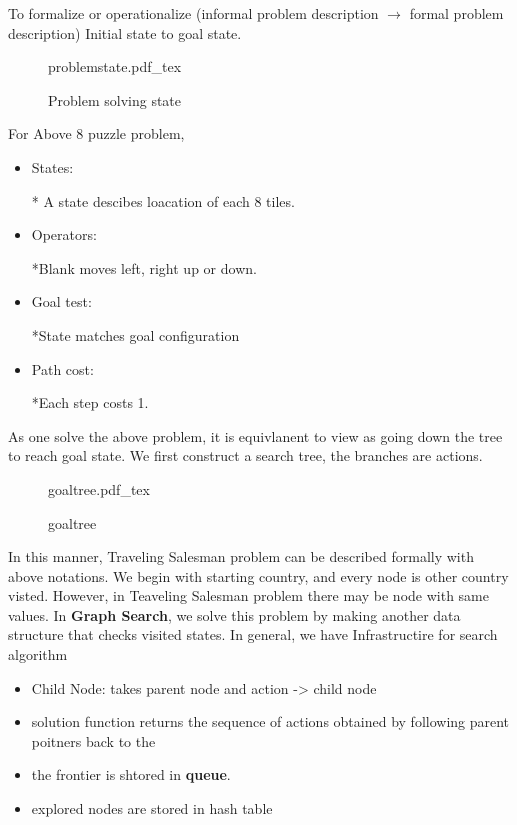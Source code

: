 \documentclass[12pt]{article}
\begin{document}
\maketitle
To formalize or operationalize (informal problem description $\rightarrow$ formal problem description)
Initial state to goal state.
\begin{figure}[H]
	\centering
	\def\svgwidth{\columnwidth}
	{problemstate.pdf_tex}
	\caption{Problem solving state}
	\label{fig:problemstate}
\end{figure}

For Above 8 puzzle problem,
\begin{itemize}
  \item States:

  * A state descibes loacation of each 8 tiles.
  \item Operators:

  *Blank moves left, right up or down.
  \item Goal test:

  *State matches goal configuration
  \item Path cost:

  *Each step costs 1.
\end{itemize}

As one solve the above problem, it is equivlanent to view as going down the tree to reach goal state.
We first construct a search tree, the branches are actions.


\begin{figure}[H]
	\centering
	\def\svgwidth{\columnwidth}
	{goaltree.pdf_tex}
	\caption{goaltree}
	\label{fig:goaltree}
\end{figure}


In this manner, Traveling Salesman problem can be described formally with above notations. We begin with starting country, and every node is other country visted.
However, in Teaveling Salesman problem there may be node with same values. In \textbf{Graph Search}, we solve this problem by making another data structure that checks visited states.
In general, we have
\large{Infrastructire for search algorithm}

\begin{itemize}
  \item Child Node: takes parent node and action -> child node
  \item solution function returns the sequence of actions obtained by following parent poitners back to the %
  \item the frontier is shtored in \textbf{queue}. %
  \item explored nodes are stored in hash table %
\end{itemize}
\end{document}
